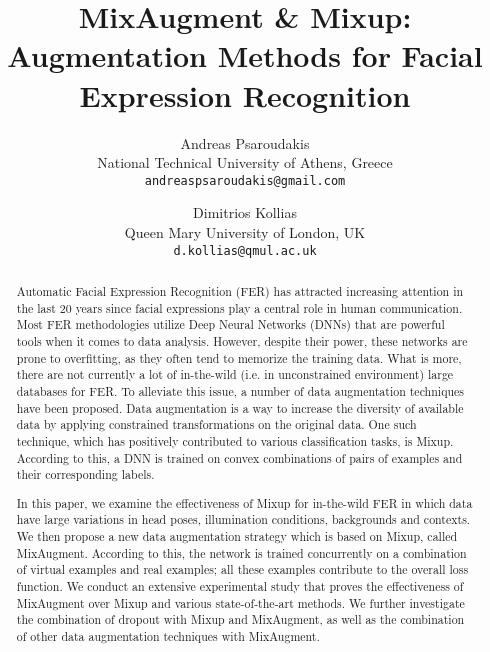 \documentclass[10pt,twocolumn,letterpaper]{article}
\begin{document}
\title{MixAugment \& Mixup: \\ Augmentation Methods for Facial Expression Recognition}

\author{Andreas Psaroudakis\\
National Technical University of Athens, Greece\\
{\tt\small andreaspsaroudakis@gmail.com}
\and
Dimitrios Kollias\\
Queen Mary University of London, UK\\
{\tt\small d.kollias@qmul.ac.uk}
}
\maketitle

\begin{abstract}

Automatic Facial Expression Recognition (FER) has attracted increasing attention in the last 20 years since facial expressions play a central role in human communication. Most FER methodologies utilize Deep Neural Networks (DNNs) that are powerful tools when it comes to data analysis. However, despite their power, these networks are prone to overfitting, as they often tend to memorize the training data. What is more, there are not currently a lot of in-the-wild (i.e. in unconstrained environment) large databases for FER. To alleviate this issue, a number of data augmentation techniques have been proposed. Data augmentation is a way to increase the diversity of available data by applying constrained transformations on the original data. One such technique, which has positively contributed to various classification tasks, is Mixup. According to this, a DNN is trained on convex combinations of pairs of examples and their corresponding labels. 

In this paper, we examine the effectiveness of Mixup for in-the-wild FER in which data have large variations in head poses, illumination conditions, backgrounds and contexts. We then propose a new data augmentation strategy which is based on Mixup, called MixAugment. According to this, the network is trained concurrently on a combination of virtual examples and real examples; all these examples contribute to the overall loss function. We conduct an extensive experimental study that proves the effectiveness of MixAugment over Mixup and various state-of-the-art methods. We further investigate the combination of dropout with Mixup and MixAugment, as well as the combination of other data augmentation techniques with MixAugment.

\end{abstract}
\end{document}
